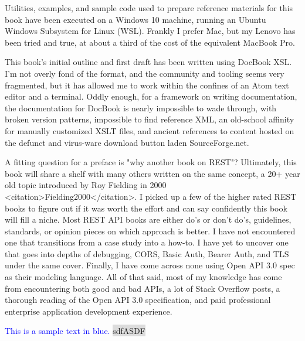 Utilities, examples, and sample code used to prepare reference materials for this book have been executed on a Windows 10 machine, running an Ubuntu Windows Subsystem for Linux (WSL).  Frankly I prefer Mac, but my Lenovo has been tried and true, at about a third of the cost of the equivalent MacBook Pro.

This book's initial outline and first draft has been written using DocBook XSL.  I'm not overly fond of the format, and the community and tooling seems very fragmented, but it has allowed me to work within the confines of an Atom text editor and a terminal.  Oddly enough, for a framework on writing documentation, the documentation for DocBook is nearly impossible to wade through, with broken version patterns, impossible to find reference XML, an old-school affinity for manually customized XSLT files, and ancient references to content hosted on the defunct and virus-ware download button laden SourceForge.net.

A fitting question for a preface is "why another book on REST"?  Ultimately, this book will share a shelf with many others written on the same concept, a 20+ year old topic introduced by Roy Fielding in 2000 <citation>Fielding2000</citation>.  I picked up a few of the higher rated REST books to figure out if it was worth the effort and can say confidently this book will fill a niche. Most REST API books are either do's or don't do's, guidelines, standards, or opinion pieces on which approach is better.  I have not encountered one that transitions from a case study into a how-to.  I have yet to uncover one that goes into depths of debugging, CORS, Basic Auth, Bearer Auth, and TLS under the same cover.  Finally, I have come across none using Open API 3.0 spec as their modeling language.  All of that said, most of my knowledge has come from encountering both good and bad APIs, a lot of Stack Overflow posts, a thorough reading of the Open API 3.0 specification, and paid professional enterprise application development experience.

\textcolor{blue}{This is a sample text in blue.}
\colorbox{Gainsboro}{sdfASDF} \medskip
